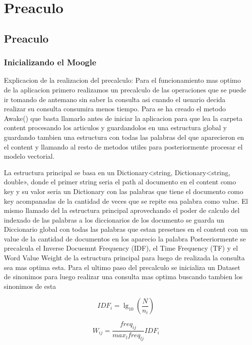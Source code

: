 \section{Preaculo}
\subsection{Preaculo}

\begin{frame}
	\frametitle{Inicializando el Moogle}
	Explicacion de la realizacion del precalculo:
 Para el funcionamiento mas optimo de la aplicacion primero
 realizamos un precalculo de las operaciones que se puede ir
 tomando de antemano sin saber la consulta asi cuando el usuario
 decida realizar su consulta consumira menos tiempo. Para se ha
 creado el metodo Awake() que basta llamarlo antes de iniciar la
 aplicacion para que lea la carpeta content procesando los
 articulos y guardandolos en una estructura global y guardando
 tambien una estructura con todas las palabras del que
 aparecieron en el content y llamando al resto de metodos utiles
 para posteriormente procesar el modelo vectorial.


\end{frame}


\begin{frame}
	La estructura principal se basa en un Dictionary<string,
 Dictionary<string, double», donde el primer string seria el path al
 documento en el content como key y su valor seria un Dictionary
 con las palabras que tiene el documento como key acompanadas
 de la cantidad de veces que se repite esa palabra como value.
 El mismo llamado del la estructura principal aprovechando el
 poder de calculo del indexado de las palabras a los diccionarios
 de los documento se guarda un Diccionario global con todas las
 palabras que estan presetnes en el content con un value de la
 cantidad de documentos en los aparecio la palabra
 Posteeriormente se precalcula el Inverse Docuemnt Frequency
 (IDF), el Time Frequency (TF) y el Word Value Weight de la
 estructura principal para luego de realizada la consulta sea mas
 optima esta. Para el ultimo paso del precalculo se inicializa un
 Dataset de sinonimos para luego realizar una consulta mas
 optima buscando tambien los sinonimos de esta
\end{frame}


\begin{frame}
	
	$$
		IDF_{i}=\lg_{10}{(\frac{N}{n_{i}})}
	$$
	
	$$
		W_{ij}=\frac{freq_{ij}}{max_{l}freq_{lj}} IDF_{i}
	$$
\end{frame}

